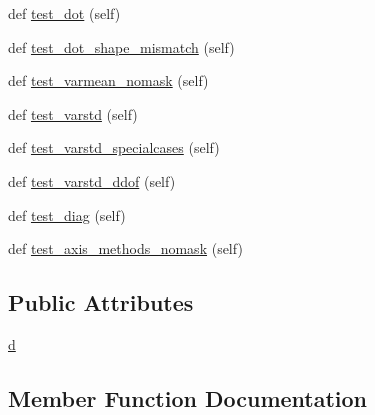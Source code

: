 \begin{DoxyCompactItemize}
\item 
def \hyperlink{classnumpy_1_1ma_1_1tests_1_1test__core_1_1TestMaskedArrayMathMethods_ab945a81be781552a9c12854a9c4336f7}{test\+\_\+dot} (self)
\item 
def \hyperlink{classnumpy_1_1ma_1_1tests_1_1test__core_1_1TestMaskedArrayMathMethods_a5b598c559356283f58f7d41b5629bfe6}{test\+\_\+dot\+\_\+shape\+\_\+mismatch} (self)
\item 
def \hyperlink{classnumpy_1_1ma_1_1tests_1_1test__core_1_1TestMaskedArrayMathMethods_aeb8c03f8dbfafe290d422d3a76acf348}{test\+\_\+varmean\+\_\+nomask} (self)
\item 
def \hyperlink{classnumpy_1_1ma_1_1tests_1_1test__core_1_1TestMaskedArrayMathMethods_a0cd29abb1899d8fbfdf0b98a8d6daa3c}{test\+\_\+varstd} (self)
\item 
def \hyperlink{classnumpy_1_1ma_1_1tests_1_1test__core_1_1TestMaskedArrayMathMethods_a2a7ab780e0196f03c8fbd9797bf7b03f}{test\+\_\+varstd\+\_\+specialcases} (self)
\item 
def \hyperlink{classnumpy_1_1ma_1_1tests_1_1test__core_1_1TestMaskedArrayMathMethods_aa74e688c62b02f6c8013e9c5854c86c9}{test\+\_\+varstd\+\_\+ddof} (self)
\item 
def \hyperlink{classnumpy_1_1ma_1_1tests_1_1test__core_1_1TestMaskedArrayMathMethods_a5ac6e31a8dcee0ecaad23a4aa532e9bd}{test\+\_\+diag} (self)
\item 
def \hyperlink{classnumpy_1_1ma_1_1tests_1_1test__core_1_1TestMaskedArrayMathMethods_ac08036cd2d8bc396f5436b76ac689ac4}{test\+\_\+axis\+\_\+methods\+\_\+nomask} (self)
\end{DoxyCompactItemize}
\subsection*{Public Attributes}
\begin{DoxyCompactItemize}
\item 
\hyperlink{classnumpy_1_1ma_1_1tests_1_1test__core_1_1TestMaskedArrayMathMethods_a3f1059d38cca87e096a16f5c7ecbefb8}{d}
\end{DoxyCompactItemize}


\subsection{Member Function Documentation}
\mbox{\label{classnumpy_1_1ma_1_1tests_1_1test__core_1_1TestMaskedArrayMathMethods_a0c08dcd1dd18ecc5f35a8ceb5fb5d99a}} 
